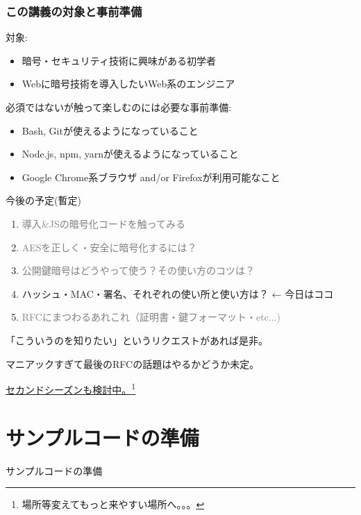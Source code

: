 \documentclass[12pt,dvipdfmx]{beamer}
\begin{document}


\begin{frame}
\frametitle{この講義の対象と事前準備}
対象:
\begin{itemize}
\item 暗号・セキュリティ技術に興味がある初学者
\item Webに暗号技術を導入したいWeb系のエンジニア
\end{itemize}

\vspace{2ex}

必須ではないが触って楽しむのには必要な事前準備:
\begin{itemize}
\item Bash, Gitが使えるようになっていること
\item Node.js, npm, yarnが使えるようになっていること
\item Google Chrome系ブラウザ and/or Firefoxが利用可能なこと
\end{itemize}
\end{frame}

\begin{frame}
今後の予定(暫定)
\begin{enumerate}
 \item \textcolor{gray}{導入\&JSの暗号化コードを触ってみる}
 \item \textcolor{gray}{AESを正しく・安全に暗号化するには？}
 \item \textcolor{gray}{公開鍵暗号はどうやって使う？その使い方のコツは？}
 \item \alert{ハッシュ・MAC・署名、それぞれの使い所と使い方は？} ← 今日はココ
 \item \textcolor{gray}{RFCにまつわるあれこれ（証明書・鍵フォーマット・etc...)}
\end{enumerate}
「こういうのを知りたい」というリクエストがあれば是非。

マニアックすぎて最後のRFCの話題はやるかどうか未定。

\vspace{2ex}

\underline{セカンドシーズンも検討中。}\footnote[frame]{場所等変えてもっと来やすい場所へ。。。}
\end{frame}

\section{サンプルコードの準備}
\begin{frame}
\centering
{\Large サンプルコードの準備}
\end{frame}
\end{document}

